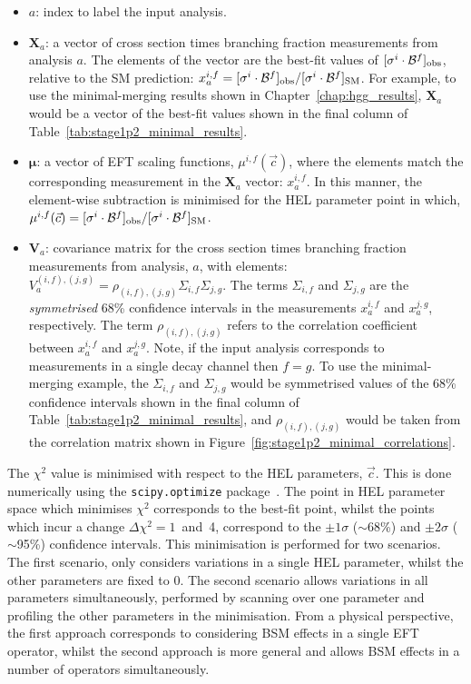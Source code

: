 \begin{itemize}
    \item $a$: index to label the input analysis.
    \item $\mathbf{X}_a$: a vector of cross section times branching fraction measurements from analysis $a$. The elements of the vector are the best-fit values of $[\sigma^i\cdot\mathcal{B}^f]_{\rm{obs}}$, relative to the SM prediction: $x^{i,f}_a=[\sigma^i\cdot\mathcal{B}^f]_{\rm{obs}}/[\sigma^i\cdot\mathcal{B}^f]_{\rm{SM}}$. For example, to use the \Hgg minimal-merging results shown in Chapter~\ref{chap:hgg_results}, $\mathbf{X}_a$ would be a vector of the best-fit values shown in the final column of Table~\ref{tab:stage1p2_minimal_results}.
    \item $\pmb{\mu}$: a vector of EFT scaling functions, $\mu^{i,f}(\vec{c})$, where the elements match the corresponding measurement in the $\mathbf{X}_a$ vector: $x^{i,f}_a$. In this manner, the element-wise subtraction is minimised for the HEL parameter point in which,\\ $\mu^{i,f}(\vec{c})=[\sigma^i\cdot\mathcal{B}^f]_{\rm{obs}}/[\sigma^i\cdot\mathcal{B}^f]_{\rm{SM}}$.
    \item $\mathbf{V}_a$: covariance matrix for the cross section times branching fraction measurements from analysis, $a$, with elements: $V^{(i,f),(j,g)}_a = \rho_{(i,f),(j,g)}\Sigma_{i,f}\Sigma_{j,g}$. The terms $\Sigma_{i,f}$ and $\Sigma_{j,g}$ are the \textit{symmetrised} 68\% confidence intervals in the measurements $x^{i,f}_a$ and $x^{j,g}_a$, respectively. The term $\rho_{(i,f),(j,g)}$ refers to the correlation coefficient between $x^{i,f}_a$ and $x^{j,g}_a$. Note, if the input analysis corresponds to measurements in a single decay channel then $f=g$. To use the \Hgg minimal-merging example, the $\Sigma_{i,f}$ and $\Sigma_{j,g}$ would be symmetrised values of the 68\% confidence intervals shown in the final column of Table~\ref{tab:stage1p2_minimal_results}, and $\rho_{(i,f),(j,g)}$ would be taken from the correlation matrix shown in Figure~\ref{fig:stage1p2_minimal_correlations}.
\end{itemize}

The $\chi^2$ value is minimised with respect to the HEL parameters, $\vec{c}$. This is done numerically using the \texttt{scipy.optimize} package~\cite{scipy}. The point in HEL parameter space which minimises $\chi^2$ corresponds to the best-fit point, whilst the points which incur a change $\Delta\chi^2=1$~and~4, correspond to the $\pm1\sigma$ ($\sim$68\%) and $\pm2\sigma$ ($\sim$95\%) confidence intervals. This minimisation is performed for two scenarios. The first scenario, only considers variations in a single HEL parameter, whilst the other parameters are fixed to 0. The second scenario allows variations in all parameters simultaneously, performed by scanning over one parameter and profiling the other parameters in the minimisation. From a physical perspective, the first approach corresponds to considering BSM effects in a single EFT operator, whilst the second approach is more general and allows BSM effects in a number of operators simultaneously.

